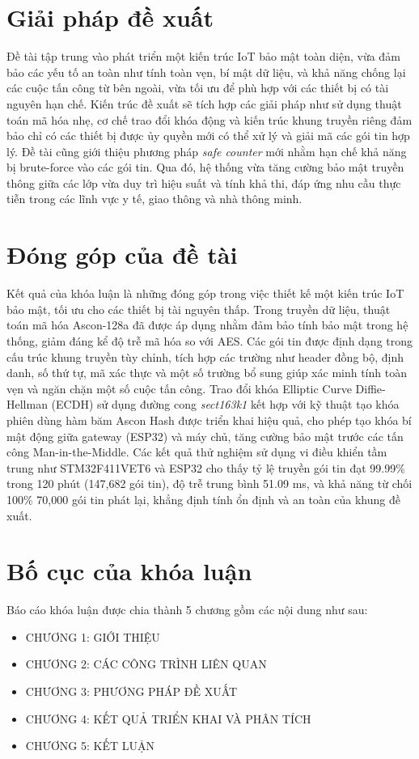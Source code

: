 \section{Giải pháp đề xuất}
Đề tài tập trung vào phát triển một kiến trúc IoT bảo mật toàn diện, vừa đảm bảo các yếu tố an toàn như tính toàn vẹn, bí mật dữ liệu, và khả năng chống lại các cuộc tấn công từ bên ngoài, vừa tối ưu để phù hợp với các thiết bị có tài nguyên hạn chế. Kiến trúc đề xuất sẽ tích hợp các giải pháp như sử dụng thuật toán mã hóa nhẹ, cơ chế trao đổi khóa động và kiến trúc khung truyền riêng đảm bảo chỉ có các thiết bị được ủy quyền mới có thể xử lý và giải mã các gói tin hợp lý. Đề tài cũng giới thiệu phương pháp \textit{safe counter} mới nhằm hạn chế khả năng bị brute-force vào các gói tin. Qua đó, hệ thống vừa tăng cường bảo mật truyền thông giữa các lớp vừa duy trì hiệu suất và tính khả thi, đáp ứng nhu cầu thực tiễn trong các lĩnh vực y tế, giao thông và nhà thông minh.

\section{Đóng góp của đề tài}
Kết quả của khóa luận là những đóng góp trong việc thiết kế một kiến trúc IoT bảo mật, tối ưu cho các thiết bị tài nguyên thấp. Trong truyền dữ liệu, thuật toán mã hóa Ascon-128a đã được áp dụng nhằm đảm bảo tính bảo mật trong hệ thống, giảm đáng kể độ trễ mã hóa so với AES. Các gói tin được định dạng trong cấu trúc khung truyền tùy chỉnh, tích hợp các trường như header đồng bộ, định danh, số thứ tự, mã xác thực và một số trường bổ sung giúp xác minh tính toàn vẹn và ngăn chặn một số cuộc tấn công. Trao đổi khóa Elliptic Curve Diffie-Hellman (ECDH) sử dụng đường cong \textit{sect163k1} kết hợp với kỹ thuật tạo khóa phiên dùng hàm băm Ascon Hash được triển khai hiệu quả, cho phép tạo khóa bí mật động giữa gateway (ESP32) và máy chủ, tăng cường bảo mật trước các tấn công Man-in-the-Middle. Các kết quả thử nghiệm sử dụng vi điều khiển tầm trung như STM32F411VET6 và ESP32 cho thấy tỷ lệ truyền gói tin đạt 99.99\% trong 120 phút (147,682 gói tin), độ trễ trung bình 51.09 ms, và khả năng từ chối 100\% 70,000 gói tin phát lại, khẳng định tính ổn định và an toàn của khung đề xuất. 

\section{Bố cục của khóa luận}

Báo cáo khóa luận được chia thành 5 chương gồm các nội dung như sau:
\begin{itemize}
    \item CHƯƠNG 1: GIỚI THIỆU
    \item CHƯƠNG 2: CÁC CÔNG TRÌNH LIÊN QUAN
    \item CHƯƠNG 3: PHƯƠNG PHÁP ĐỀ XUẤT
    \item CHƯƠNG 4: KẾT QUẢ TRIỂN KHAI VÀ PHÂN TÍCH
    \item CHƯƠNG 5: KẾT LUẬN
\end{itemize}

